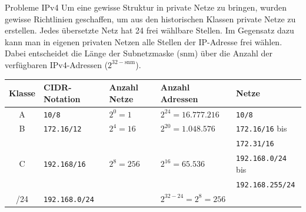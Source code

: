 \begin{bonus}{Probleme IPv4}
    Um eine gewisse Struktur in private Netze zu bringen, wurden gewisse Richtlinien geschaffen, um aus den historischen Klassen private Netze zu erstellen.
    Jedes übersetzte Netz hat 24 frei wählbare Stellen.
    Im Gegensatz dazu kann man in eigenen privaten Netzen alle Stellen der IP-Adresse frei wählen.
    Dabei entscheidet die Länge der Subnetzmaske ($\text{snm}$) über die Anzahl der verfügbaren IPv4-Adressen ($2^{32-\text{snm}}$).
    \begin{center}
        \begin{tabular}{|c|l|l|l|l|}
            \hline
            \textbf{Klasse} & \textbf{CIDR-Notation} & \textbf{Anzahl Netze} & \textbf{Anzahl Adressen} & \textbf{Netze}            \\\hline
            A               & \texttt{10/8}          & $2^0 = 1$             & $2^{24} = 16.777.216$    & \texttt{10/8}             \\\hline
            B               & \texttt{172.16/12}     & $2^4 = 16$            & $2^{20} = 1.048.576$     & \texttt{172.16/16} bis    \\
                            &                        &                       &                          & \texttt{172.31/16}        \\\hline
            C               & \texttt{192.168/16}    & $2^8 = 256$           & $2^{16} = 65.536$        & \texttt{192.168.0/24} bis \\
                            &                        &                       &                          & \texttt{192.168.255/24}   \\\hline
            /24             & \texttt{192.168.0/24}  &                       & $2^{32-24} = 2^8 = 256$  &                           \\\hline
        \end{tabular}
    \end{center}
\end{bonus}

